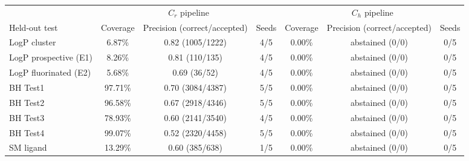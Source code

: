 \begin{tabular}{@{}lcccccc@{}}
\toprule
 & \multicolumn{3}{c}{$C_r$ pipeline} & \multicolumn{3}{c}{$C_h$ pipeline} \\
\cmidrule(lr){2-4}\cmidrule(lr){5-7}
Held-out test & Coverage & Precision (correct/accepted) & Seeds & Coverage & Precision (correct/accepted) & Seeds \\
\midrule
LogP cluster & 6.87\% & 0.82 (1005/1222) & 4/5 & 0.00\% & abstained (0/0) & 0/5 \\
LogP prospective (E1) & 8.26\% & 0.81 (110/135) & 4/5 & 0.00\% & abstained (0/0) & 0/5 \\
LogP fluorinated (E2) & 5.68\% & 0.69 (36/52) & 4/5 & 0.00\% & abstained (0/0) & 0/5 \\
BH Test1 & 97.71\% & 0.70 (3084/4387) & 5/5 & 0.00\% & abstained (0/0) & 0/5 \\
BH Test2 & 96.58\% & 0.67 (2918/4346) & 5/5 & 0.00\% & abstained (0/0) & 0/5 \\
BH Test3 & 78.93\% & 0.60 (2141/3540) & 4/5 & 0.00\% & abstained (0/0) & 0/5 \\
BH Test4 & 99.07\% & 0.52 (2320/4458) & 5/5 & 0.00\% & abstained (0/0) & 0/5 \\
SM ligand & 13.29\% & 0.60 (385/638) & 1/5 & 0.00\% & abstained (0/0) & 0/5 \\
\bottomrule
\end{tabular}